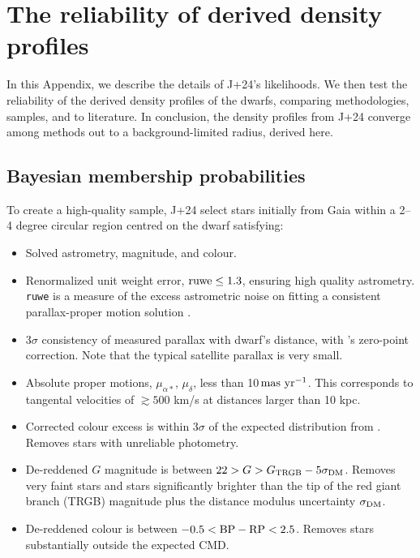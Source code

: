 \chapter{The reliability of derived density
profiles}\label{sec:extra_density}

In this Appendix, we describe the details of J+24's likelihoods. We then
test the reliability of the derived density profiles of the dwarfs,
comparing methodologies, samples, and to literature. In conclusion, the
density profiles from J+24 converge among methods out to a
background-limited radius, derived here.

\section{Bayesian membership
probabilities}\label{bayesian-membership-probabilities}

To create a high-quality sample, J+24 select stars initially from Gaia
within a 2--4 degree circular region centred on the dwarf satisfying:

\begin{itemize}
\tightlist
\item
  Solved astrometry, magnitude, and colour.
\item
  Renormalized unit weight error, \({\rm ruwe} \leq 1.3\), ensuring high
  quality astrometry. \texttt{ruwe} is a measure of the excess
  astrometric noise on fitting a consistent parallax-proper motion
  solution \citep[see][]{lindegren+2021}.\\
\item
  3\(\sigma\) consistency of measured parallax with dwarf's distance,
  with \citet{lindegren+2021}'s zero-point correction. Note that the
  typical satellite parallax is very small.
\item
  Absolute proper motions, \(\mu_{\alpha*}\), \(\mu_\delta\), less than
  10\(\,{\rm mas\ yr^{-1}}\). This corresponds to tangental velocities
  of \(\gtrsim 500\) km/s at distances larger than 10 kpc.
\item
  Corrected colour excess is within 3\(\sigma\) of the expected
  distribution from \citet{riello+2021}. Removes stars with unreliable
  photometry.
\item
  De-reddened \(G\) magnitude is between
  \(22 > G > G_{\rm TRGB} - 5\sigma_{\rm DM}\). Removes very faint stars
  and stars significantly brighter than the tip of the red giant branch
  (TRGB) magnitude plus the distance modulus uncertainty
  \(\sigma_{\rm DM}\).
\item
  De-reddened colour is between \(-0.5 < {\rm BP - RP} <  2.5\). Removes
  stars substantially outside the expected CMD.
\end{itemize}

